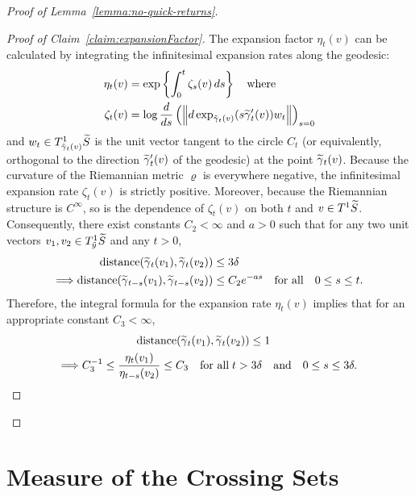 \documentclass[AHL, Unicode, longabstracts, published]{cedram}
\newcommand{\xset}[1]{\left\{ #1 \right\}}
\DeclareMathOperator{\distance}{distance}
\let\oldtilde\tilde
\renewcommand*{\tilde}[1]{\mathchoice{\widetilde{#1}}{\widetilde{#1}}{\oldtilde{#1}}{\oldtilde{#1}}}\let\oldforall\forall
\renewcommand*{\forall}{\mathrel{\oldforall}}
\begin{document}
\begin{proof}[Proof of Lemma~\ref{lemma:no-quick-returns}]
\begin{proof}[Proof of Claim~\ref{claim:expansionFactor}]
The expansion factor $\eta_{t}(v)$ can be calculated by integrating the infinitesimal expansion rates along the geodesic:
\begin{align*}
\eta_{t}(v)&= \exp \xset {\int_{0}^{t} \zeta _{s}(v) \, ds }\quad \text{where} \\
\zeta_{t}(v)&= \log \frac{d}{ds}
\left(\left\|d\exp_{\tilde{\gamma}_{t}(v)} (s \tilde{\gamma}_{t}'(v))w_{t}\right\|\right)_{s=0}
\end{align*}
and $w_{t}\in T^{1}_{\tilde{\gamma}_{t}(v)}\tilde{S}$ is the unit vector tangent to the circle $C_{t}$ (or equivalently, orthogonal to the direction $\tilde{\gamma}_{t}'(v)$ of the geodesic) at the point $\tilde{\gamma}_{t}(v)$. Because the curvature of the Riemannian metric ${\varrho}$ is everywhere negative, the infinitesimal expansion rate $\zeta_{t}(v)$ is strictly positive. Moreover, because the Riemannian structure is $C^{\infty}$, so is the dependence of $\zeta_{t}(v)$ on both $t$ and $v \in T^{1}\tilde{S}$. Consequently, there exist constants $C_{2}<\infty$ and $a>0$ such that for any two unit vectors $v_{1}, v_{2}\in T^{1}_{\tilde{y}}\tilde{S}$ and any $t>0$,
\begin{align*}
\distance(\tilde{\gamma}_{t}(v_{1}),\tilde{\gamma}_{t}(v_{2})) &\leq 3\delta \\
\Longrightarrow\distance(\tilde{\gamma}_{t-s}(v_{1}),\tilde{\gamma}_{t-s}(v_{2})) &\leq C_{2}e^{-as} \quad \text{for all} \quad 0 \leq s \leq t.
\end{align*}
Therefore, the integral formula for the expansion rate $\eta_{t}(v)$ implies that for an appropriate constant $C_{3}<\infty$,
\begin{multline*}
\distance (\tilde{\gamma}_{t}(v_{1}),\tilde{\gamma}_{t}(v_{2})) \leq 1
\quad\\
\Longrightarrow C_{3}^{-1}\leq \frac{\eta_{t}(v_{1})}{\eta_{t-s}(v_{2})} \leq C_{3} \quad \text{for all} \; t>3\delta \quad \text{and}\quad 0\leq s \leq 3\delta.\qedhere
\end{multline*}
\end{proof}\let\qed\relax
\end{proof}



\section{Measure of the Crossing Sets}\label{sec:asymptotics}
\end{document}
